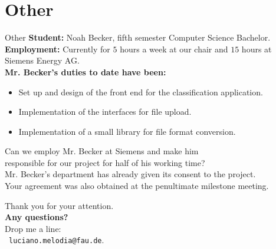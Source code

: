 \documentclass[aspectratio=169,t]{beamer}
\begin{document}
\section{Other}
  { 
    \begin{frame}{Other}
    \textbf{Student:} Noah Becker, fifth semester Computer Science Bachelor. \\
    \textbf{Employment:} Currently for $5$ hours a week at our chair and $15$ hours at Siemens Energy AG.\\[0.5cm]
    \textbf{Mr. Becker's duties to date have been:}
    \begin{itemize}[noitemsep]
      \item Set up and design of the front end for the classification application.
      \item Implementation of the interfaces for file upload.
      \item Implementation of a small library for file format conversion.
    \end{itemize}
    Can we employ Mr. Becker at Siemens and make him \\
    responsible for our project for half of his working time?\\[0.5cm]
    Mr. Becker's department has already given its consent to the project.\\
    Your agreement was also obtained at the penultimate milestone meeting.
    \end{frame}
  }

  { %
    \begin{frame}[c]
      \begin{center}
        Thank you for your attention.\\
        {\bf Any questions?}\\[0.5cm]
        Drop me a line: \\ 
        \faSendO \ \texttt{luciano.melodia@fau.de}.
      \end{center}
    \end{frame}
  }
\end{document}
